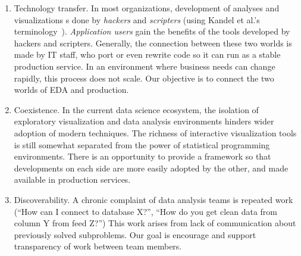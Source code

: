 \begin{enumerate}

\item Technology transfer.
In most organizations, development of analyses and visualizations 
s done by \emph{hackers} and \emph{scripters} (using Kandel et al.'s
terminology~\cite{Kandel:2012:EDA}). \emph{Application users} 
gain the benefits of the tools developed by hackers and scripters.
Generally, the connection between these two worlds is made by IT staff,
who port or even rewrite code so it can run as a stable production service.
In an environment where business needs can change rapidly, this
process does not scale. Our objective is to connect the two worlds
of EDA and production.

\item Coexistence. In the current data science ecosystem, the
isolation of exploratory visualization and data analysis
environments hinders wider adoption of modern techniques.
The richness of interactive visualization tools is still somewhat
separated from the power of statistical programming environments.
There is an opportunity to provide a framework so that developments
on each side are more easily adopted by the other, and made available
in production services.

\item Discoverability. A chronic complaint of data analysis teams is
repeated work (``How can I connect to database X?'', ``How do you get
clean data from column Y from feed Z?'')  This work arises from lack of
communication about previously solved subproblems.  Our goal is encourage
and support transparency of work between team members.

\end{enumerate}


